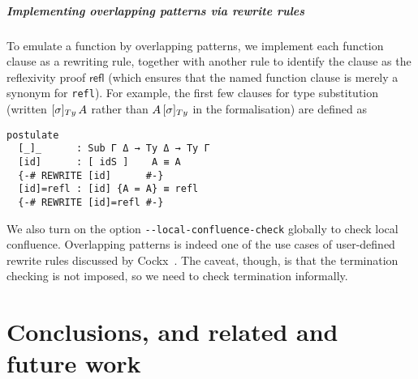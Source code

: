 \documentclass[a4paper,UKenglish,numberwithinsect,cleveref,thm-restate]{lipics-v2021}
\newcommand{\LT}[2][]{\todo[inline,author={L-T},caption={},color={pink},#1]{#2}}
\begin{document}
\subparagraph*{Implementing overlapping patterns via rewrite rules}
To emulate a function by overlapping patterns, we implement each function clause as a rewriting rule, together with another rule to identify the clause as the reflexivity proof $\mathsf{refl}$ (which ensures that the named function clause is merely a synonym for \lstinline|refl|).
For example, the first few clauses for type substitution (written $[\sigma]_{\Ty}\,A$ rather than $\subTy{A}{\sigma}$ in the formalisation) are defined as
\begin{lstlisting}
postulate
  [_]_      : Sub Γ Δ → Ty Δ → Ty Γ
  [id]      : [ idS ]    A ≡ A
  {-# REWRITE [id]      #-}
  [id]=refl : [id] {A = A} ≡ refl
  {-# REWRITE [id]=refl #-}
\end{lstlisting}
We also turn on the option \texttt{-{}-local-confluence-check} globally to check local confluence.
%
Overlapping patterns is indeed one of the use cases of user-defined rewrite rules discussed by Cockx~\cite{Cockx2020}.
The caveat, though, is that the termination checking is not imposed, so we need to check termination informally.

%
% 
%

\section{Conclusions, and related and future work}\label{sec:conclusion}
\end{document}
